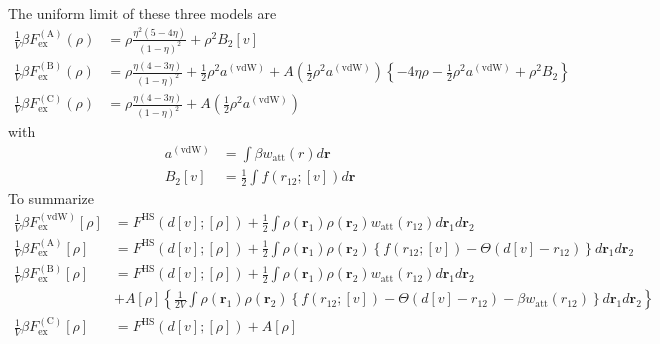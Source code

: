 \documentclass[aps,preprint]{revtex4-1}%
\begin{document}
The uniform limit of these three models are
\begin{align}
\frac{1}{V}\beta F_{\text{ex}}^{\left(  \text{A}\right)  }\left(  \rho\right)
&  =\rho\frac{\eta^{2}\left(  5-4\eta\right)  }{\left(  1-\eta\right)  ^{2}%
}+\rho^{2}B_{2}\left[  v\right] \\
\frac{1}{V}\beta F_{\text{ex}}^{\left(  \text{B}\right)  }\left(  \rho\right)
&  =\rho\frac{\eta\left(  4-3\eta\right)  }{\left(  1-\eta\right)  ^{2}}%
+\frac{1}{2}\rho^{2}a^{\left(  \text{vdW}\right)  }+A\left(  \frac{1}{2}%
\rho^{2}a^{\left(  \text{vdW}\right)  }\right)  \left\{  -4\eta\rho-\frac
{1}{2}\rho^{2}a^{\left(  \text{vdW}\right)  }+\rho^{2}B_{2}\right\}
\nonumber\\
\frac{1}{V}\beta F_{\text{ex}}^{\left(  \text{C}\right)  }\left(  \rho\right)
&  =\rho\frac{\eta\left(  4-3\eta\right)  }{\left(  1-\eta\right)  ^{2}%
}+A\left(  \frac{1}{2}\rho^{2}a^{\left(  \text{vdW}\right)  }\right) \nonumber
\end{align}
with%
\begin{align}
a^{\left(  \text{vdW}\right)  }  &  =\int\beta w_{\text{att}}\left(  r\right)
d\mathbf{r}\\
B_{2}\left[  v\right]   &  =\frac{1}{2}\int f\left(  r_{12};\left[  v\right]
\right)  d\mathbf{r}\nonumber
\end{align}
To summarize%
\begin{align}
\frac{1}{V}\beta F_{\text{ex}}^{\left(  \text{vdW}\right)  }\left[
\rho\right]   &  =F^{\text{HS}}\left(  d\left[  v\right]  ;\left[
\rho\right]  \right)  +\frac{1}{2}\int\rho\left(  \mathbf{r}_{1}\right)
\rho\left(  \mathbf{r}_{2}\right)  w_{\text{att}}\left(  r_{12}\right)
d\mathbf{r}_{1}d\mathbf{r}_{2}\\
\frac{1}{V}\beta F_{\text{ex}}^{\left(  \text{A}\right)  }\left[  \rho\right]
&  =F^{\text{HS}}\left(  d\left[  v\right]  ;\left[  \rho\right]  \right)
+\frac{1}{2}\int\rho\left(  \mathbf{r}_{1}\right)  \rho\left(  \mathbf{r}%
_{2}\right)  \left\{  f\left(  r_{12};\left[  v\right]  \right)
-\Theta\left(  d\left[  v\right]  -r_{12}\right)  \right\}  d\mathbf{r}%
_{1}d\mathbf{r}_{2}\nonumber\\
\frac{1}{V}\beta F_{\text{ex}}^{\left(  \text{B}\right)  }\left[  \rho\right]
&  =F^{\text{HS}}\left(  d\left[  v\right]  ;\left[  \rho\right]  \right)
+\frac{1}{2}\int\rho\left(  \mathbf{r}_{1}\right)  \rho\left(  \mathbf{r}%
_{2}\right)  w_{\text{att}}\left(  r_{12}\right)  d\mathbf{r}_{1}%
d\mathbf{r}_{2}\nonumber\\
&  +A\left[  \rho\right]  \left\{  \frac{1}{2V}\int\rho\left(  \mathbf{r}%
_{1}\right)  \rho\left(  \mathbf{r}_{2}\right)  \left\{  f\left(
r_{12};\left[  v\right]  \right)  -\Theta\left(  d\left[  v\right]
-r_{12}\right)  -\beta w_{\text{att}}\left(  r_{12}\right)  \right\}
d\mathbf{r}_{1}d\mathbf{r}_{2}\right\} \nonumber\\
\frac{1}{V}\beta F_{\text{ex}}^{\left(  \text{C}\right)  }\left[  \rho\right]
&  =F^{\text{HS}}\left(  d\left[  v\right]  ;\left[  \rho\right]  \right)
+A\left[  \rho\right] \nonumber
\end{align}
\end{document}
